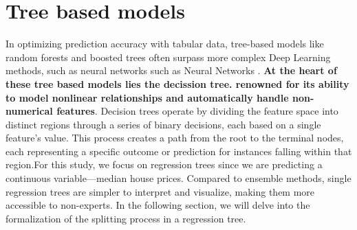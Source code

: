 \documentclass[12pt]{article}
\begin{document}
\section{Tree based models}
In optimizing prediction accuracy with tabular data, tree-based models like random forests and boosted trees often surpass more complex Deep Learning methods, such as neural networks such as Neural Networks \cite{Chen_2016} \cite{grinsztajn2022treebased}.
\textbf{At the heart of these tree based models lies the decission tree. renowned for its ability to model nonlinear relationships and automatically handle non-numerical features}. Decision trees operate by dividing the feature space into distinct regions through a series of binary decisions, each based on a single feature's value. This process creates a path from the root to the terminal nodes, each representing a specific outcome or prediction for instances falling within that region.For this study, we focus on regression trees since we are predicting a continuous variable—median house prices. 
Compared to ensemble methods, single regression trees are simpler to interpret and visualize, making them more accessible to non-experts. In the following section, we will delve into the formalization of the splitting process in a regression tree.
\end{document}
